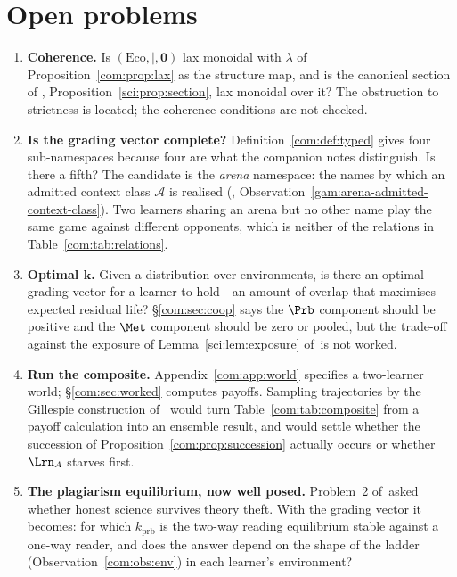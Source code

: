 \section{Open problems}\label{com:S15}

\begin{enumerate}[itemsep=4pt]
\item \textbf{Coherence.} Is $(\mathrm{Eco}, \mid, \mathbf{0})$ lax monoidal with
$\lambda$ of Proposition~\ref{com:prop:lax} as the structure map, and is the canonical section of
\chSci, Proposition~\ref{sci:prop:section}, lax monoidal over it? The obstruction to strictness is located; the
coherence conditions are not checked.

\item \textbf{Is the grading vector complete?} Definition~\ref{com:def:typed} gives four
sub-namespaces because four are what the companion notes distinguish. Is there a fifth? The
candidate is the \emph{arena} namespace: the names by which an admitted context class
$\mathcal{A}$ is realised (\chGame, Observation~\ref{gam:arena-admitted-context-class}). Two learners sharing an arena but no other name
play the same game against different opponents, which is neither of the relations in
Table~\ref{com:tab:relations}.

\item \textbf{Optimal $\mathbf{k}$.} Given a distribution over environments, is there an optimal
grading vector for a learner to hold---an amount of overlap that maximises expected residual
life? \S\ref{com:sec:coop} says the $\Prb$ component should be positive and the $\Met$ component
should be zero or pooled, but the trade-off against the exposure of Lemma~\ref{sci:lem:exposure}
of~\chSci is not worked.

\item \textbf{Run the composite.} Appendix~\ref{com:app:world} specifies a two-learner world;
\S\ref{com:sec:worked} computes payoffs. Sampling trajectories by the Gillespie construction
of~\cite{StochSim} would turn Table~\ref{com:tab:composite} from a payoff calculation into an
ensemble result, and would settle whether the succession of Proposition~\ref{com:prop:succession}
actually occurs or whether $\Lrn_A$ starves first.

\item \textbf{The plagiarism equilibrium, now well posed.} Problem~2 of~\chSci asked
whether honest science survives theory theft. With the grading vector it becomes: for which
$k_{\mathrm{prb}}$ is the two-way reading equilibrium stable against a one-way reader, and does
the answer depend on the shape of the ladder (Observation~\ref{com:obs:env}) in each learner's
environment?


\end{enumerate}
